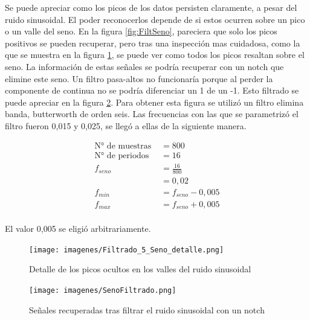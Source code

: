 \documentclass[12pt,letterpaper]{article}     %
\begin{document}
Se puede apreciar como los picos de los datos persisten claramente, a pesar del ruido
sinusoidal. El poder reconocerlos depende de si estos ocurren sobre un pico o 
un valle del seno. En la figura \ref{fig:FiltSeno}, pareciera que solo los picos positivos
se pueden recuperar, pero tras una inspección mas cuidadosa, como la que se muestra en la
figura \ref{fig:FiltSenoRect}, se puede ver como todos los picos resaltan sobre el seno.
La información de estas señales se podría recuperar con un notch que elimine este seno.
Un filtro pasa-altos no funcionaría porque al perder la componente de continua no se podría 
diferenciar un 1 de un -1. Esto filtrado se puede apreciar en la figura \ref{fig:senoFiltrado}.
Para obtener esta figura se utilizó un filtro elimina banda, butterworth de orden seis.
Las frecuencias con las que se parametrizó el filtro fueron 0,015 y 0,025, se llegó a ellas 
de la siguiente manera.

\begin{equation}
	\begin{split}
		\text{N° de muestras }&=800\\
		\text{N° de periodos }&=16\\
		f_{seno} &=
		\frac{ 16 }{ 800 }\\
		  &= 0,02\\
		f_{min}&=f_{seno}-0,005\\
		f_{max}&=f_{seno}+0,005\\
	\end{split}
\end{equation}

El valor 0,005 se eligió arbitrariamente.

\begin{figure}[!ht]
\centering
\texttt{[image: imagenes/Filtrado\_5\_Seno\_detalle.png]}
\caption{Detalle de los picos ocultos en los valles del ruido sinusoidal}
\label{fig:FiltSenoRect}
\end{figure}

\begin{figure}[!ht]
\centering
\texttt{[image: imagenes/SenoFiltrado.png]}
\caption{Señales recuperadas tras filtrar el ruido sinusoidal con un notch}
\label{fig:senoFiltrado}
\end{figure}
\end{document}
